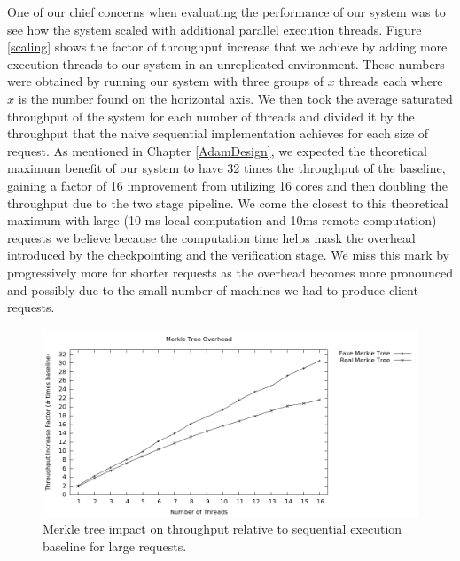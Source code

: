 \documentclass[11pt, oneside]{report}
\begin{document}
One of our chief concerns when evaluating the performance of our system was to see how the system scaled with additional parallel execution threads. Figure \ref{scaling} shows the factor of throughput increase that we achieve by adding more execution threads to our system in an unreplicated environment. 
These numbers were obtained by running our system with three groups of $x$ threads each where $x$ is the number found on the horizontal axis. 
We then took the average saturated throughput of the system for each number of threads and divided it by the throughput that the naive sequential implementation achieves for each size of request.
As mentioned in Chapter \ref{AdamDesign}, we expected the theoretical maximum benefit of our system to have 32 times the throughput of the baseline, gaining a factor of 16 improvement from utilizing 16 cores and then doubling the throughput due to the two stage pipeline.
We come the closest to this theoretical maximum with large (10 ms local computation and 10ms remote computation) requests  we believe because the computation time helps mask the overhead introduced by the checkpointing and the verification stage.
We miss this mark by progressively more for shorter requests as the overhead becomes more pronounced and possibly due to the small number of machines we had to produce client requests.

\begin{figure}[h]
\centering
\includegraphics[width=1.0\textwidth]{graphs/merkleimpact/graph.png}
\caption{\label{scalingmedmerkletree}Merkle tree impact on throughput relative to sequential execution baseline for large requests.}
\end{figure}
\end{document}
